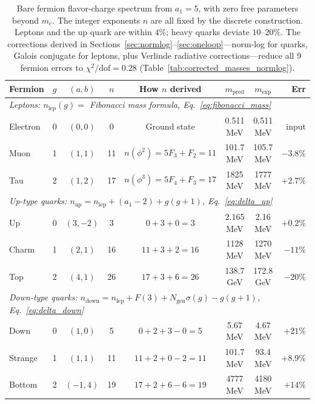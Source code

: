 \documentclass[12pt,a4paper]{article}
\theoremstyle{definition}
\begin{document}
\begin{table}[H]
\centering
\begin{tabular}{lccccccr}
\toprule
\textbf{Fermion} & $g$ & $(a,b)$ & $n$ & \textbf{How $n$ derived} & $m_{\text{pred}}$ & $m_{\text{exp}}$ & \textbf{Err} \\
\midrule
\multicolumn{8}{l}{\textit{Leptons: $n_{\text{lep}}(g) = $ Fibonacci mass formula, Eq.~\eqref{eq:fibonacci_mass}}} \\
Electron & 0 & $(0,0)$ & 0 & Ground state & 0.511 MeV & 0.511 MeV & input \\
Muon & 1 & $(1,1)$ & 11 & $n(\phi^2) = 5F_3 + F_2 = 11$ & 101.7 MeV & 105.7 MeV & $-3.8\%$ \\
Tau & 2 & $(1,2)$ & 17 & $n(\phi^3) = 5F_4 + F_3 = 17$ & 1825 MeV & 1777 MeV & $+2.7\%$ \\
\midrule
\multicolumn{8}{l}{\textit{Up-type quarks: $n_{\text{up}} = n_{\text{lep}} + (a_1-2) + g(g+1)$, Eq.~\eqref{eq:delta_up}}} \\
Up & 0 & $(3,-2)$ & 3 & $0 + 3 + 0 = 3$ & 2.165 MeV & 2.16 MeV & $+0.2\%$ \\
Charm & 1 & $(2,1)$ & 16 & $11 + 3 + 2 = 16$ & 1128 MeV & 1270 MeV & $-11\%$ \\
Top & 2 & $(4,1)$ & 26 & $17 + 3 + 6 = 26$ & 138.7 GeV & 172.8 GeV & $-20\%$ \\
\midrule
\multicolumn{8}{l}{\textit{Down-type quarks: $n_{\text{down}} = n_{\text{lep}} + F(3) + N_{\text{gen}}\sigma(g) - g(g+1)$, Eq.~\eqref{eq:delta_down}}} \\
Down & 0 & $(1,0)$ & 5 & $0 + 2 + 3 - 0 = 5$ & 5.67 MeV & 4.67 MeV & $+21\%$ \\
Strange & 1 & $(1,1)$ & 11 & $11 + 2 + 0 - 2 = 11$ & 101.7 MeV & 93.4 MeV & $+8.9\%$ \\
Bottom & 2 & $(-1,4)$ & 19 & $17 + 2 + 6 - 6 = 19$ & 4777 MeV & 4180 MeV & $+14\%$ \\
\bottomrule
\end{tabular}
\caption{Bare fermion flavor-charge spectrum from $a_1 = 5$, with zero free parameters beyond $m_e$. The integer exponents $n$ are all fixed by the discrete construction. Leptons and the up quark are within $4\%$; heavy quarks deviate $10$--$20\%$. The corrections derived in Sections~\ref{sec:normlog}--\ref{sec:oneloop}---norm-log for quarks, Galois conjugate for leptons, plus Verlinde radiative corrections---reduce all 9 fermion errors to $\chi^2/\text{dof} = 0.28$ (Table~\ref{tab:corrected_masses_normlog}).}
\label{tab:masses}
\end{table}
\end{document}
